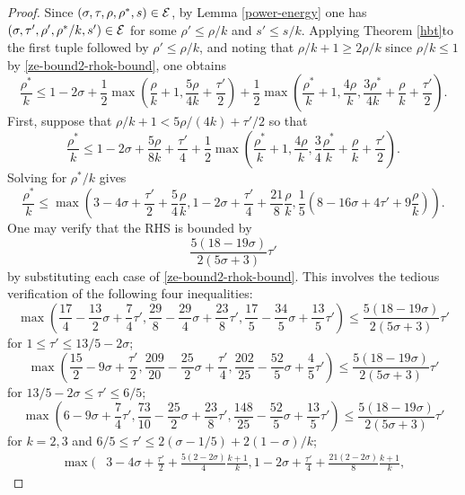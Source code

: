 \begin{proof}
Since $(\sigma, \tau, \rho, \rho^*, s) \in \mathcal{E}$, by Lemma \ref{power-energy} one has $(\sigma, \tau', \rho', \rho^*/k, s') \in \mathcal{E}$ for some $\rho' \le \rho/k$ and $s'\le s/k$. Applying Theorem \eqref{hbt}to the first tuple followed by $\rho' \le \rho/k$, and noting that $\rho/k + 1 \ge 2\rho/k$ since $\rho/k \le 1$ by \eqref{ze-bound2-rhok-bound}, one obtains
\begin{equation}\label{ze-bound2-rhostar-boundk}
\frac{\rho^*}{k} \le 1-2\sigma + \frac{1}{2}\max\left(\frac{\rho}{k}+1, \frac{5\rho}{4k} + \frac{\tau'}{2}\right) + \frac{1}{2}\max\left(\frac{\rho^*}{k}+1, \frac{4\rho}{k}, \frac{3\rho^*}{4k} +\frac{\rho}{k}+\frac{\tau'}{2}\right).
\end{equation}
First, suppose that $\rho/k  + 1 < 5\rho/(4k) + \tau'/2$ so that 
\[
\frac{\rho^*}{k} \leq 1-2\sigma + \frac{5\rho}{8k} + \frac{\tau'}{4} + \frac{1}{2}\max\left(\frac{\rho^*}{k}+1, \frac{4\rho}{k}, \frac{3}{4}\frac{\rho^*}{k} + \frac{\rho}{k}+\frac{\tau'}{2}\right).
\]
Solving for $\rho^*/k$ gives 
\[
\frac{\rho^*}{k} \le \max\left(3 - 4\sigma + \frac{\tau'}{2} + \frac{5}{4}\frac{\rho}{k}, 1 - 2\sigma + \frac{\tau'}{4} + \frac{21}{8}\frac{\rho}{k}, \frac{1}{5}(8 - 16\sigma + 4\tau' + 9\frac{\rho}{k})\right).
\]
One may verify that the RHS is bounded by
\[
\frac{5(18 - 19\sigma)}{2(5\sigma + 3)}\tau'
\]
by substituting each case of \eqref{ze-bound2-rhok-bound}. This involves the tedious verification of the following four inequalities:
\begin{equation}\label{ze-bound2-rho-case1-1}
\max\left(\frac{17}{4} - \frac{13}{2}\sigma + \frac{7}{4}\tau', \frac{29}{8} - \frac{29}{4}\sigma + \frac{23}{8}\tau', \frac{17}{5} - \frac{34}{5}\sigma + \frac{13}{5}\tau'\right) \le \frac{5(18 - 19\sigma)}{2(5\sigma + 3)}\tau'
\end{equation}
for $1 \le \tau' \le 13/5 - 2\sigma$; 
\[
\max\left(\frac{15}{2} - 9\sigma + \frac{\tau'}{2}, \frac{209}{20} - \frac{25}{2}\sigma + \frac{\tau'}{4}, \frac{202}{25} - \frac{52}{5}\sigma + \frac{4}{5}\tau'\right) \le \frac{5(18 - 19\sigma)}{2(5\sigma + 3)}\tau'
\]
for $13/5 - 2\sigma \le \tau' \le 6/5$; 
\[
\max\left(6 - 9\sigma + \frac{7}{4}\tau', \frac{73}{10} - \frac{25}{2}\sigma + \frac{23}{8}\tau', \frac{148}{25} - \frac{52}{5}\sigma + \frac{13}{5}\tau'\right) \le \frac{5(18 - 19\sigma)}{2(5\sigma + 3)}\tau'
\]
for $k = 2, 3$ and $6/5 \le \tau' \le 2(\sigma - 1/5) + 2(1-\sigma)/k$;
\begin{equation*}
\begin{split}
\max(&3 - 4\sigma + \frac{\tau'}{2} + \frac{5(2 - 2\sigma)}{4}\frac{k + 1}{k}, 1 - 2\sigma + \frac{\tau'}{4} + \frac{21(2 - 2\sigma)}{8}\frac{k + 1}{k},

\end{split}
\end{equation*}
\end{proof}
